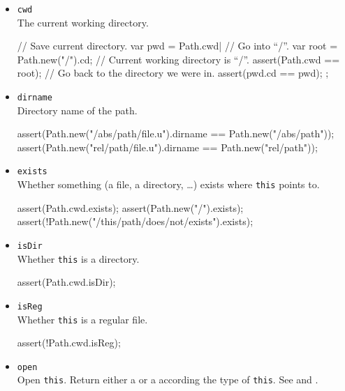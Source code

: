\begin{itemize}
\item \lstinline|cwd|\\
  The current working directory.
\begin{urbiscript}[firstnumber=last]
{
  // Save current directory.
  var pwd = Path.cwd|
  // Go into ``/''.
  var root = Path.new("/").cd;
  // Current working directory is ``/''.
  assert(Path.cwd == root);
  // Go back to the directory we were in.
  assert(pwd.cd == pwd);
};
\end{urbiscript}

\item \lstinline|dirname|\\
  Directory name of the path.
\begin{urbiscript}[firstnumber=last]
assert(Path.new("/abs/path/file.u").dirname == Path.new("/abs/path"));
assert(Path.new("rel/path/file.u").dirname  == Path.new("rel/path"));
\end{urbiscript}

\item \lstinline|exists|\\
  Whether something (a file, a directory, \ldots) exists where
  \lstinline|this| points to.
\begin{urbiscript}[firstnumber=last]
assert(Path.cwd.exists);
assert(Path.new("/").exists);
assert(!Path.new("/this/path/does/not/exists").exists);
\end{urbiscript}

\item \lstinline|isDir|\\
  Whether \lstinline|this| is a directory.
\begin{urbiscript}[firstnumber=last]
assert(Path.cwd.isDir);
\end{urbiscript}

\item \lstinline|isReg|\\
  Whether \lstinline|this| is a regular file.
\begin{urbiscript}[firstnumber=last]
assert(!Path.cwd.isReg);
\end{urbiscript}

\item \lstinline|open|\\
  Open \lstinline|this|. Return either a  or a
   according the type of \lstinline|this|. See
   and .


\end{itemize}
